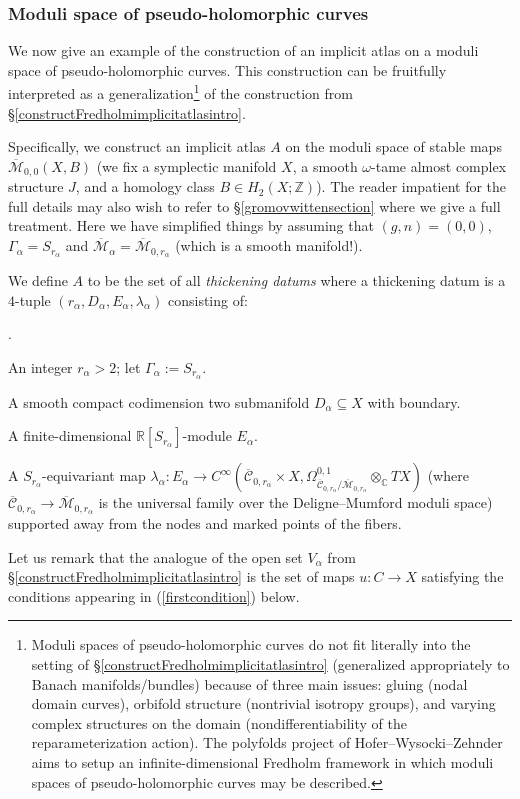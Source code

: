\documentclass[12pt]{article}
\theoremstyle{definition}
\theoremstyle{remark}
\numberwithin{equation}{subsection}
\newcommand{\CC}{\mathbb C}
\newcommand{\ZZ}{\mathbb Z}
\newcommand{\RR}{\mathbb R}
\newcommand{\Mbar}{\overline{\mathcal M}}
\newcommand{\Cbar}{\overline{\mathcal C}}
\newcounter{rcounti}
\newenvironment{rlist}{\begin{list}{\roman{rcounti}.}{\usecounter{rcounti}
\setlength\itemsep{0pt}
\setlength\labelsep{4pt}
\setlength\labelwidth{16pt}
\setlength\leftmargin{32pt}
\setlength\listparindent{0pt}
\setlength\parsep{0pt}
\setlength\parskip{0pt}
\setlength\partopsep{0pt}
\setlength\rightmargin{0pt}
\setlength\topsep{0pt}
\setlength\itemindent{0pt}
}}{\end{list}}
\begin{document}
\subsubsection{Moduli space of pseudo-holomorphic curves}\label{constructJholimplicitatlasintro}

We now give an example of the construction of an implicit atlas on a moduli space of pseudo-holomorphic curves.  This construction can be fruitfully interpreted as a generalization\footnote{Moduli spaces of pseudo-holomorphic curves do not fit literally into the setting of \S\ref{constructFredholmimplicitatlasintro} (generalized appropriately to Banach manifolds/bundles) because of three main issues: gluing (nodal domain curves), orbifold structure (nontrivial isotropy groups), and varying complex structures on the domain (nondifferentiability of the reparameterization action).  The polyfolds project of Hofer--Wysocki--Zehnder aims to setup an infinite-dimensional Fredholm framework in which moduli spaces of pseudo-holomorphic curves may be described.} of the construction from \S\ref{constructFredholmimplicitatlasintro}.

Specifically, we construct an implicit atlas $A$ on the moduli space of stable maps $\Mbar_{0,0}(X,B)$ (we fix a symplectic manifold $X$, a smooth $\omega$-tame almost complex structure $J$, and a homology class $B\in H_2(X;\ZZ)$).  The reader impatient for the full details may also wish to refer to \S\ref{gromovwittensection} where we give a full treatment.  Here we have simplified things by assuming that $(g,n)=(0,0)$, $\Gamma_\alpha=S_{r_\alpha}$ and $\Mbar_\alpha=\Mbar_{0,r_\alpha}$ (which is a smooth manifold!).

We define $A$ to be the set of all \emph{thickening datums} where a thickening datum is a $4$-tuple $(r_\alpha,D_\alpha,E_\alpha,\lambda_\alpha)$ consisting of:
\begin{rlist}
\item An integer $r_\alpha>2$; let $\Gamma_\alpha:=S_{r_\alpha}$.
\item A smooth compact codimension two submanifold $D_\alpha\subseteq X$ with boundary.
\item A finite-dimensional $\RR[S_{r_\alpha}]$-module $E_\alpha$.
\item A $S_{r_\alpha}$-equivariant map $\lambda_\alpha:E_\alpha\to C^\infty(\Cbar_{0,r_\alpha}\times X,\Omega^{0,1}_{\Cbar_{0,r_\alpha}/\Mbar_{0,r_\alpha}}\otimes_\CC TX)$ (where $\Cbar_{0,r_\alpha}\to\Mbar_{0,r_\alpha}$ is the universal family over the Deligne--Mumford moduli space) supported away from the nodes and marked points of the fibers.
\end{rlist}
Let us remark that the analogue of the open set $V_\alpha$ from \S\ref{constructFredholmimplicitatlasintro} is the set of maps $u:C\to X$ satisfying the conditions appearing in (\ref{firstcondition}) below.
\end{document}
